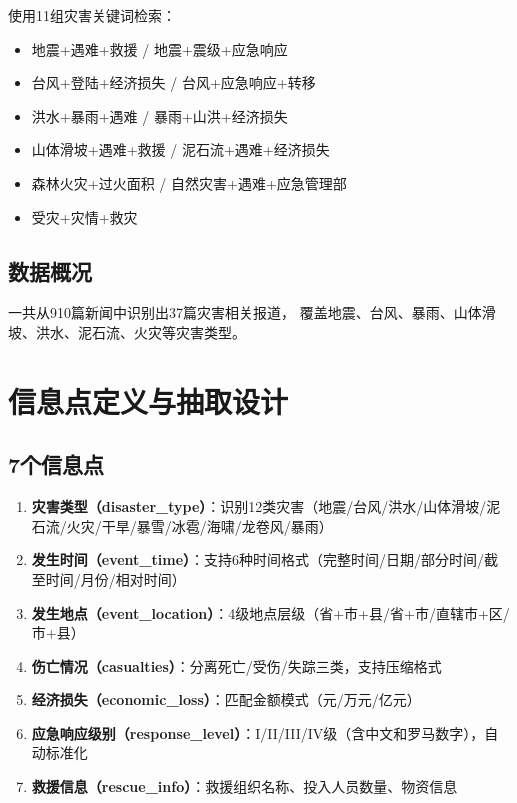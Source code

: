 \documentclass[12pt,a4paper]{ctexart}
\begin{document}
使用11组灾害关键词检索：
\begin{itemize}
    \item 地震+遇难+救援 / 地震+震级+应急响应
    \item 台风+登陆+经济损失 / 台风+应急响应+转移
    \item 洪水+暴雨+遇难 / 暴雨+山洪+经济损失
    \item 山体滑坡+遇难+救援 / 泥石流+遇难+经济损失
    \item 森林火灾+过火面积 / 自然灾害+遇难+应急管理部
    \item 受灾+灾情+救灾
\end{itemize}

\subsection{数据概况}

一共从910篇新闻中识别出37篇灾害相关报道，
覆盖地震、台风、暴雨、山体滑坡、洪水、泥石流、火灾等灾害类型。

\section{信息点定义与抽取设计}

\subsection{7个信息点}

\begin{enumerate}
    \item \textbf{灾害类型（disaster\_type）}：识别12类灾害（地震/台风/洪水/山体滑坡/泥石流/火灾/干旱/暴雪/冰雹/海啸/龙卷风/暴雨）
    \item \textbf{发生时间（event\_time）}：支持6种时间格式（完整时间/日期/部分时间/截至时间/月份/相对时间）
    \item \textbf{发生地点（event\_location）}：4级地点层级（省+市+县/省+市/直辖市+区/市+县）
    \item \textbf{伤亡情况（casualties）}：分离死亡/受伤/失踪三类，支持压缩格式
    \item \textbf{经济损失（economic\_loss）}：匹配金额模式（元/万元/亿元）
    \item \textbf{应急响应级别（response\_level）}：I/II/III/IV级（含中文和罗马数字），自动标准化
    \item \textbf{救援信息（rescue\_info）}：救援组织名称、投入人员数量、物资信息
\end{enumerate}
\end{document}
